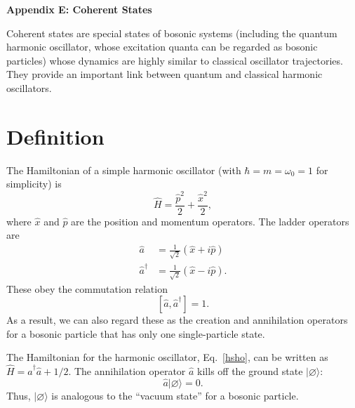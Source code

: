 \documentclass[pra,12pt]{revtex4}
\begin{document}
\begin{center}
{\large \textbf{Appendix E: Coherent States}}
\end{center}

Coherent states are special states of bosonic systems (including the
quantum harmonic oscillator, whose excitation quanta can be regarded
as bosonic particles) whose dynamics are highly similar to classical
oscillator trajectories.  They provide an important link between
quantum and classical harmonic oscillators.

\section{Definition}

The Hamiltonian of a simple harmonic oscillator (with $\hbar = m =
\omega_0 = 1$ for simplicity) is
\begin{equation}
  \hat{H} = \frac{\hat{p}^2}{2} + \frac{\hat{x}^2}{2},
  \label{hsho}
\end{equation}
where $\hat{x}$ and $\hat{p}$ are the position and momentum operators.
The ladder operators are
\begin{align}
  \hat{a} &= \frac{1}{\sqrt{2}} \left(\hat{x} + i\hat{p}\right)
  \label{a} \\
  \hat{a}^\dagger &= \frac{1}{\sqrt{2}} \left(\hat{x} - i\hat{p}\right).
  \label{adagger}
\end{align}
These obey the commutation relation
\begin{equation}
  \left[\hat{a}, \hat{a}^\dagger\right] = 1.
  \label{commutator}
\end{equation}
As a result, we can also regard these as the creation and annihilation
operators for a bosonic particle that has only one single-particle
state.

The Hamiltonian for the harmonic oscillator, Eq.~\eqref{hsho}, can be
written as $\hat{H} = \hat{a}^\dagger\hat{a} + 1/2$.  The annihilation
operator $\hat{a}$ kills off the ground state $|\varnothing\rangle$:
\begin{equation}
  \hat{a} |\varnothing\rangle = 0.
  \label{annihilation}
\end{equation}
Thus, $|\varnothing\rangle$ is analogous to the ``vacuum state'' for a
bosonic particle.
\end{document}
